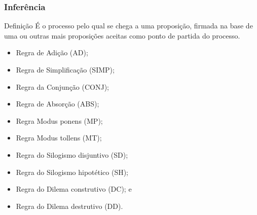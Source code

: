 \documentclass[aspectratio=169]{beamer} %
\begin{document}
\begin{frame}
\frametitle{Inferência}

\begin{block}{Definição}
É o processo pelo qual se chega a uma proposição, firmada na base de uma ou outras mais proposições aceitas como ponto de partida do processo.
\end{block}\vfill

\begin{itemize}
	\item Regra de Adição (AD);
	\item Regra de Simplificação (SIMP);
	\item Regra da Conjunção (CONJ);
	\item Regra de Absorção (ABS);
	\item Regra Modus ponens (MP);
	\item Regra Modus tollens (MT);
	\item Regra do Silogismo disjuntivo (SD);
	\item Regra do Silogismo hipotético (SH);
	\item Regra do Dilema construtivo (DC); e
	\item Regra do Dilema destrutivo (DD).
\end{itemize}
\end{frame}
\end{document}
